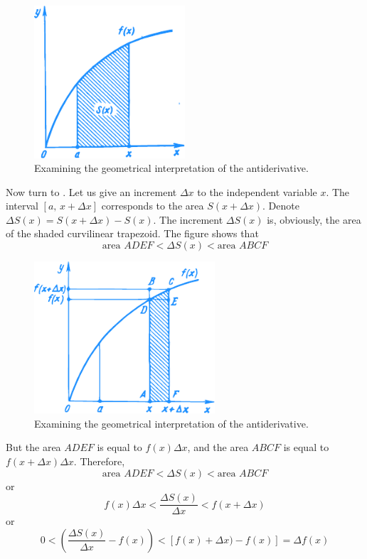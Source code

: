 \begin{figure}[!ht]%
\centering
\includegraphics[width=0.5\textwidth]{figures/fig-45.pdf}
\caption{Examining the geometrical interpretation of the antiderivative.}
\label{fig-45}
\end{figure}

Now turn to . Let us give an increment $\Delta x$ to the independent variable $x$. The interval $[a, \, x + \Delta x]$ corresponds to the area $S (x + \Delta x)$. Denote $\Delta S(x) = S (x + \Delta x)- S (x)$. The increment $\Delta S(x)$ is, obviously, the area of the shaded curvilinear trapezoid. The figure shows that
\begin{equation*}%
\text{area} \,\, ADEF < \Delta S (x) < \text{area} \,\, ABCF 
\end{equation*}

\begin{figure}[!ht]%
\centering
\includegraphics[width=0.6\textwidth]{figures/fig-46.pdf}
\caption{Examining the geometrical interpretation of the antiderivative.}
\label{fig-46}
\end{figure}

But the area $ADEF$ is equal to $f (x) \Delta x$, and the area $ABCF$
is equal to $f (x +  \Delta x) \Delta x$. Therefore,
\begin{equation*}%
\text{area} \,\, ADEF < \Delta S (x) < \text{area} \,\, ABCF 
\end{equation*}
or
\begin{equation*}%
f (x) \Delta x < \dfrac{\Delta S (x)}{ \Delta x}  < f (x + \Delta x)
\end{equation*}
or
\begin{equation*}%
0 < \left(  \dfrac{\Delta S (x)}{ \Delta x}  - f (x) \right) < [f (x) + \Delta x)-	f (x)] = \Delta f(x) 
\end{equation*}

